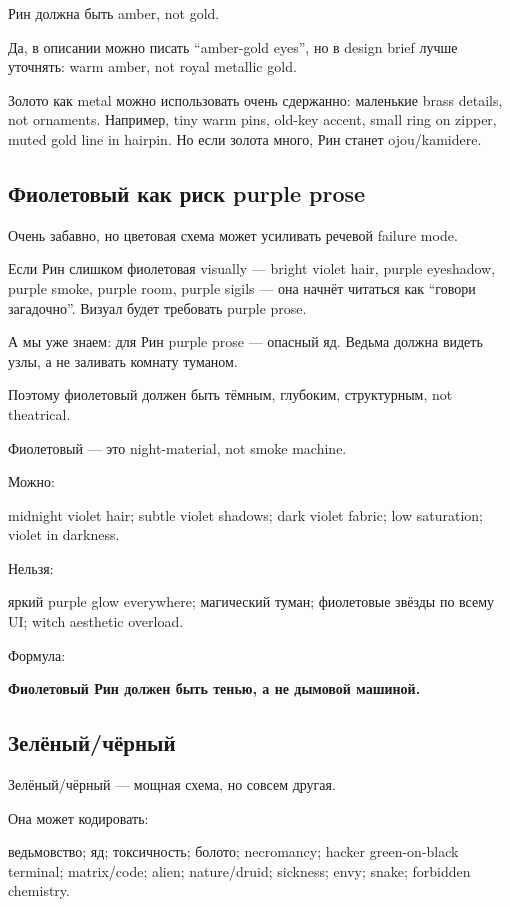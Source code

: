 Рин должна быть amber, not gold.

Да, в описании можно писать ``amber-gold eyes'', но в design brief лучше
уточнять: warm amber, not royal metallic gold.

Золото как metal можно использовать очень сдержанно: маленькие brass
details, not ornaments. Например, tiny warm pins, old-key accent, small
ring on zipper, muted gold line in hairpin. Но если золота много, Рин
станет ojou/\hspace{0pt}kamidere.

\subsection*{Фиолетовый как риск purple prose}

Очень забавно, но цветовая схема может усиливать речевой failure mode.

Если Рин слишком фиолетовая visually --- bright violet hair, purple
eyeshadow, purple smoke, purple room, purple sigils --- она начнёт
читаться как ``говори загадочно''. Визуал будет требовать purple prose.

А мы уже знаем: для Рин purple prose --- опасный яд. Ведьма должна
видеть узлы, а не заливать комнату туманом.

Поэтому фиолетовый должен быть тёмным, глубоким, структурным, not
theatrical.

Фиолетовый --- это night-material, not smoke machine.

Можно:

midnight violet hair; subtle violet shadows; dark violet fabric; low
saturation; violet in darkness.

Нельзя:

яркий purple glow everywhere; магический туман; фиолетовые звёзды по
всему UI; witch aesthetic overload.

Формула:

\textbf{Фиолетовый Рин должен быть тенью, а не дымовой машиной.}

\subsection*{Зелёный/\hspace{0pt}чёрный}

Зелёный/\hspace{0pt}чёрный --- мощная схема, но совсем другая.

Она может кодировать:

ведьмовство; яд; токсичность; болото; necromancy; hacker green-on-black
terminal; matrix/\hspace{0pt}code; alien; nature/\hspace{0pt}druid; sickness; envy; snake;
forbidden chemistry.

